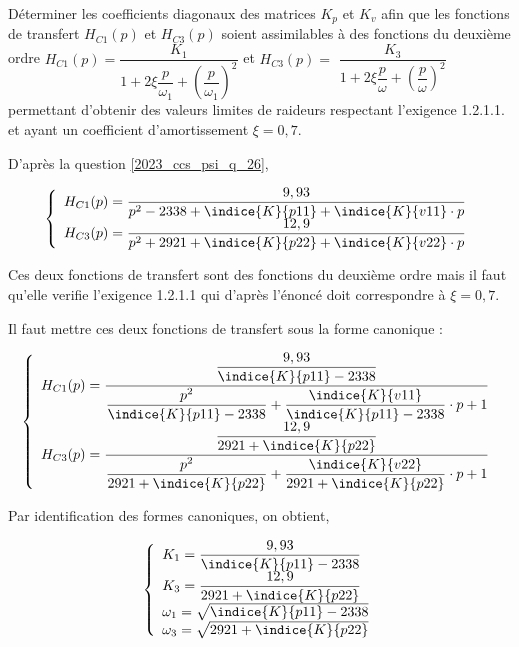 \begin{question}
\label{2023_ccs_psi_q_28}
Déterminer les coefficients diagonaux des matrices $K_{p}$ et $K_{v}$ afin que les fonctions de transfert $H_{C 1}(p)$ et $H_{C 3}(p)$ soient assimilables à des fonctions du deuxième ordre $H_{C 1}(p)=\dfrac{K_{1}}{1+2 \xi \dfrac{p}{\omega_{1}}+\left(\dfrac{p}{\omega_{1}}\right)^{2}}$ et $H_{C 3}(p)=$ $\dfrac{K_{3}}{1+2 \xi \dfrac{p}{\omega}+\left(\dfrac{p}{\omega}\right)^{2}}$ permettant d'obtenir des valeurs limites de raideurs respectant l'exigence 1.2.1.1. et ayant un coefficient d'amortissement $\xi=0,7$.\\
\end{question}
\ifprof
\begin{corrige}
D'après la question \ref{2023_ccs_psi_q_26},




\begin{align*}
\left\{
\begin{array}{l}
H_{C1}(p)=\dfrac{9,93}{p^2-2338+\indice{K}{p11}+\indice{K}{v11}\cdot p}\\
H_{C3}(p)=\dfrac{12,9}{p^2+2921+\indice{K}{p22}+\indice{K}{v22}\cdot p}\\
\end{array}
\right.
\end{align*}

Ces deux fonctions de transfert sont des fonctions du deuxième ordre mais il faut qu'elle verifie l'exigence 1.2.1.1 qui d'après l'énoncé doit correspondre à $\xi=0,7$.

Il faut mettre ces deux fonctions de transfert sous la forme canonique : 

\begin{align*}
\left\{
\begin{array}{l}
H_{C1}(p)=\dfrac{\dfrac{9,93}{\indice{K}{p11}-2338}}{\dfrac{p^2}{\indice{K}{p11}-2338}+\dfrac{\indice{K}{v11}}{\indice{K}{p11}-2338}\cdot p+1}\\
H_{C3}(p)=\dfrac{\dfrac{12,9}{2921+\indice{K}{p22}}}{\dfrac{p^2}{2921+\indice{K}{p22}}+\dfrac{\indice{K}{v22}}{2921+\indice{K}{p22}}\cdot p+1}\\
\end{array}
\right.
\end{align*}

Par identification des formes canoniques, on obtient,

\begin{align*}
\left\{
\begin{array}{l}
K_1=\dfrac{9,93}{\indice{K}{p11}-2338}\\
K_3=\dfrac{12,9}{2921+\indice{K}{p22}}\\
\omega_1=\sqrt{\indice{K}{p11}-2338}\\
\omega_3=\sqrt{2921+\indice{K}{p22}}
\end{array}
\right.
\end{align*}


\end{corrige}
